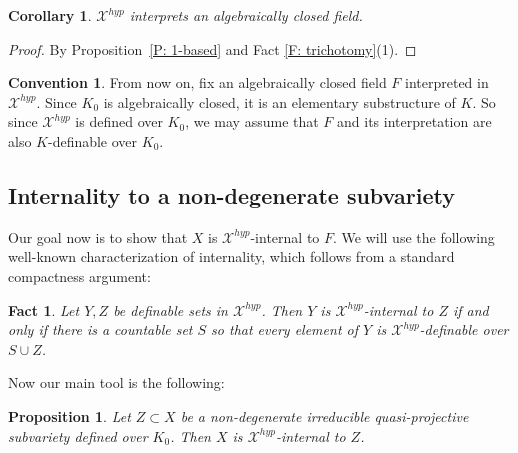 \documentclass{amsart}
\newtheorem{fact}[theorem]{Fact}
\newtheorem{corollary}[theorem]{Corollary}
\newtheorem{proposition}[theorem]{Proposition}
\theoremstyle{definition}
\newtheorem{convention}[theorem]{Convention}
\begin{document}
\begin{corollary}\label{C: interpretable field}
$\mathcal{X}^{hyp}$ interprets an algebraically closed field.
\end{corollary}

\begin{proof}
By Proposition~\ref{P: 1-based} and Fact \ref{F: trichotomy}(1). 
\end{proof}

\begin{convention}\label{Con: interpreted field}
From now on, fix an algebraically closed field $F$ interpreted in $\mathcal{X}^{hyp}$. Since $K_0$ is algebraically closed, it is an elementary substructure of $K$. So since $\mathcal X^{hyp}$ is defined over $K_0$, we may assume that $F$ and its interpretation are also $K$-definable over $K_0$.
\end{convention}

\subsection{Internality to a non-degenerate subvariety}

Our goal now is to show that $X$ is $\mathcal X^{hyp}$-internal to $F$. We will use the following well-known characterization of internality, which follows from a standard compactness argument:

\begin{fact}\label{F: internality char} Let $Y,Z$ be definable sets in $\mathcal X^{hyp}$. Then $Y$ is $\mathcal X^{hyp}$-internal to $Z$ if and only if there is a countable set $S$ so that every element of $Y$ is $\mathcal X^{hyp}$-definable over $S\cup Z$.
 
\end{fact}

Now our main tool is the following:

\begin{proposition}\label{P: internality to subvariety}
Let $Z\subset X$ be a non-degenerate irreducible quasi-projective subvariety defined over $K_0$. Then $X$ is $\mathcal X^{hyp}$-internal to $Z$.
\end{proposition}
\end{document}
